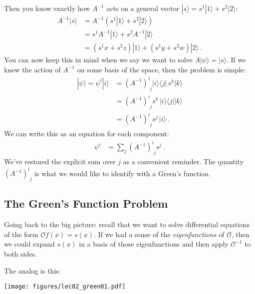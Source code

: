 Then you know exactly how $A^{-1}$ acts on a general vector $|s\rangle = s^1|1\rangle + s^2 |2\rangle$:
\begin{align}
  A^{-1} |s\rangle &=
  A^{-1} \left( s^1|1\rangle + s^2 |2\rangle \right)
  \\ 
  &=
  s^1 A^{-1} |1\rangle + s^2 A^{-1} |2\rangle
  \label{eq:Ainv:basis:action:on:gen:step2}
  \\
  &=
  (s^1x + s^2z)|1\rangle + (s^1y + s^2 w)|2\rangle \ .
  \label{eq:Ainv:basis:action:on:gen}
\end{align}
You can now keep this in mind when we say we want to solve $A|\psi\rangle = |s\rangle$. If we knew the action of $A^{-1}$ on some basis of the space, then the problem is simple:
\begin{align}
  |\psi\rangle = \psi^i |i\rangle 
  &= \left( A^{-1} \right)^i_{\phantom{i}j} |i\rangle\langle j|
  \, s^k|k\rangle 
  \\
  &= \left(A^{-1}\right)^i_{\phantom{i}j} s^k \, |i\rangle\langle j|
  |k\rangle 
  \\
  &=\left(A^{-1}\right)^i_{\phantom{i}j} s^j \, |i\rangle \ .
\end{align}
We can write this as an equation for each component:
\begin{align}
  \psi^i &= \sum_j \left(A^{-1}\right)^i_{\phantom{i}j} s^j
  \label{eq:Ainv:acting:on:source} \ .
\end{align}
We've restored the explicit sum over $j$ as a convenient reminder. The quantity $\left(A^{-1}\right)^i_{\phantom{i}j}$ is what we would like to identify with a Green's function.







\subsection{The Green’s Function Problem}

Going back to the big picture: recall that we want to solve differential equations of the form $\mathcal O f(x) = s(x)$. If we had a sense of the \emph{eigenfunctions} of $\mathcal O$, then we could expand $s(x)$ in a basis of those eigenfunctions and then apply $\mathcal O^{-1}$ to both sides. 

The analog is this:

\begin{center}
\texttt{[image: figures/lec02\_green01.pdf]}
\end{center}

